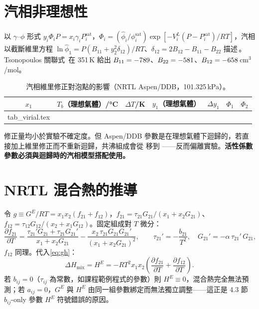 \documentclass[UTF8,a4paper,11pt,fontset=none,zihao=-4]{ctexart}
\makeatletter
\numberwithin{equation}{section}\renewcommand{\theequation}{\arabic{section}.\arabic{equation}}
\numberwithin{figure}{section}\renewcommand{\thefigure}{\arabic{section}.\arabic{figure}}
\numberwithin{table}{section}\renewcommand{\thetable}{\arabic{section}.\arabic{table}}
\newcommand{\inputtab}[1]{\@@input #1 }
\newcommand{\sat}{\mathrm{sat}}
\makeatother
\begin{document}
\section{汽相非理想性}\label{app:vapour}
以 $\gamma$--$\phi$ 形式 $y_i\Phi_iP=x_i\gamma_iP_i^{\sat}$，$\Phi_i=(\hat\phi_i/\phi_i^{\sat})\exp[-V_i^L(P-P_i^{\sat})/RT]$，汽相以截斷維里方程 $\ln\hat\phi_1=P(B_{11}+y_2^2\delta_{12})/RT$、$\delta_{12}=2B_{12}-B_{11}-B_{22}$ 描述\,\cite{svna}。Tsonopoulos 關聯式\,\cite{tsonopoulos} 在 351\,K 給出 $B_{11}=-789$、$B_{22}=-581$、$B_{12}=-658$\,cm$^3$/mol。

\begin{table}[H]
\centering\small
\caption{汽相維里修正對泡點的影響（NRTL Aspen/DDB，101.325\,kPa）。}\label{tab:virial}
\begin{tabular}{@{}ccccccc@{}}
\toprule
$x_1$ & $T_b$（理想氣體）/°C & $\Delta T$/K & $y_1$（理想氣體） & $\Delta y_1$ & $\Phi_1$ & $\Phi_2$ \\
\midrule
\inputtab{tab_virial.tex}
\bottomrule
\end{tabular}
\end{table}
修正量均小於實驗不確定度。但 Aspen/DDB 參數是在理想氣體下迴歸的，若直接加上維里修正而不重新迴歸，共沸組成會從 \nxAz{} 移到 \nxAzVir——反而偏離實驗。\textbf{活性係數參數必須與迴歸時的汽相模型搭配使用。}

\section{NRTL 混合熱的推導}\label{app:derivation}
令 $g\equiv G^E/RT=x_1x_2(f_{21}+f_{12})$，$f_{21}=\tau_{21}G_{21}/(x_1+x_2G_{21})$、$f_{12}=\tau_{12}G_{12}/(x_2+x_1G_{12})$。固定組成對 $T$ 微分：
\begin{equation}
\frac{\partial f_{21}}{\partial T}=\frac{\tau_{21}'G_{21}+\tau_{21}G_{21}'}{x_1+x_2G_{21}}-\frac{x_2\,\tau_{21}G_{21}G_{21}'}{(x_1+x_2G_{21})^{2}},\qquad
\tau_{21}'=-\frac{b_{21}}{T^{2}},\quad G_{21}'=-\alpha\,\tau_{21}'\,G_{21},
\end{equation}
$f_{12}$ 同理。代入\cref{eq:gh}：
\begin{equation}
\Delta H_{\mathrm{mix}}=H^E=-RT^{2}x_1x_2\left(\frac{\partial f_{21}}{\partial T}+\frac{\partial f_{12}}{\partial T}\right).
\end{equation}
若 $b_{ij}=0$（$\tau_{ij}$ 為常數，如課程範例程式的參數）則 $H^E\equiv0$，混合熱完全無法預測；若 $a_{ij}=0$，$G^E$ 與 $H^E$ 由同一組參數綁定而無法獨立調整——這正是 4.3 節 $b_{ij}$-only 參數 $H^E$ 符號錯誤的原因。
\end{document}
